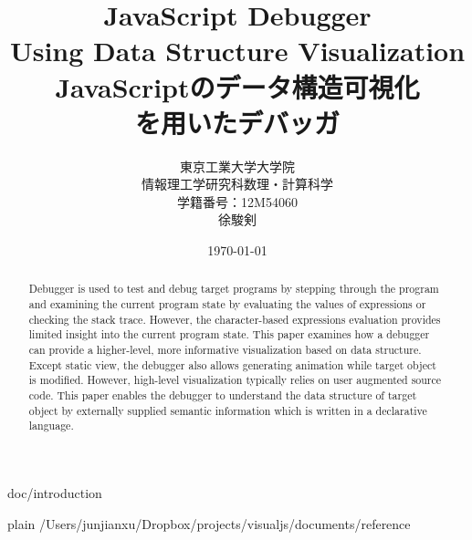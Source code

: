 \documentclass [a4paper,11pt,fleqn]{report}
\title {JavaScript Debugger\\Using Data Structure Visualization\\JavaScriptのデータ構造可視化\\を用いたデバッガ}
\author {東京工業大学大学院\\情報理工学研究科数理・計算科学\\学籍番号：12M54060\\徐駿剣}
\date {\today}
\begin{document}
\maketitle

\begin {abstract}
Debugger is used to test and debug target programs by stepping through the program and examining the current program state by evaluating the values of expressions or checking the stack trace. However, the character-based expressions evaluation provides limited insight into the current program state. This paper examines how a debugger can provide a higher-level, more informative visualization based on data structure. Except static view, the debugger also allows generating animation while target object is modified. However, high-level visualization typically relies on user augmented source code. This paper enables the debugger to understand the data structure of target object by externally supplied semantic information which is written in a declarative language.
\end {abstract}

\tableofcontents
\listoffigures
\listoftables

 {doc/introduction}

 {plain}
 {/Users/junjianxu/Dropbox/projects/visualjs/documents/reference}
\end{document}
